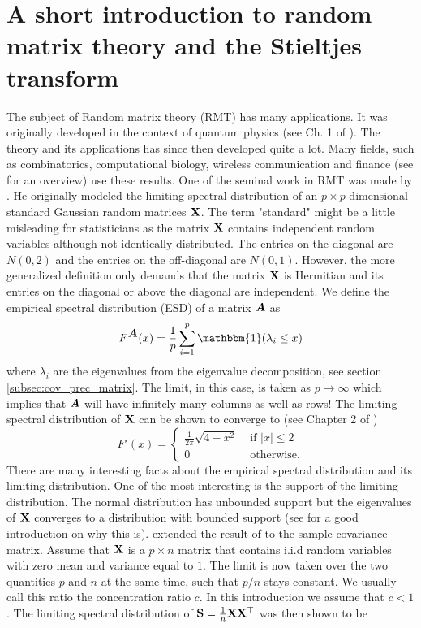\documentclass[oneside]{book}\usepackage{knitr}
\begin{document}
\section{A short introduction to random matrix theory and the Stieltjes transform}
The subject of Random matrix theory (RMT) has many applications. It was originally developed in the context of quantum physics (see Ch. 1 of \citet{mehta2004random}). The theory and its applications has since then developed quite a lot. Many fields, such as combinatorics, computational biology, wireless communication and finance (see \citet{REF} for an overview) use these results. One of the seminal work in RMT was made by \citet{wigner1993characteristic}. He originally modeled the limiting spectral distribution of an $p \times p$ dimensional standard Gaussian random matrices $\mathbf{X}$. The term "standard" might be a little misleading for statisticians as the matrix $\mathbf{X}$ contains independent random variables although not identically distributed. The entries on the diagonal are $N(0,2)$ and the entries on the off-diagonal are $N(0,1)$. However, the more generalized definition only demands that the matrix $\mathbf{X}$ is Hermitian and its entries on the diagonal or above the diagonal are independent. We define the empirical spectral distribution (ESD) of a matrix $\mbox{\boldmath$A$}$ as
$$
F^{\bA}(x)= \frac{1}{p} \sum_{i=1}^p \mathbbm{1}(\lambda_i \leq x)
$$ 
where $\lambda_i$ are the eigenvalues from the eigenvalue decomposition, see section \ref{subsec:cov_prec_matrix}. The limit, in this case, is taken as $p \rightarrow \infty$ which implies that $\mbox{\boldmath$A$}$ will have infinitely many columns as well as rows!
The limiting spectral distribution of $\mathbf{X}$ can be shown to converge to (see Chapter 2 of \citet{bai2010spectral})
$$
F'(x) = \begin{cases}
\frac{1}{2\pi} \sqrt{4-x^2} & \text{ if } |x|\leq 2 \\
0 & \text{ otherwise.}
\end{cases}
$$
There are many interesting facts about the empirical spectral distribution and its limiting distribution. One of the most interesting is the support of the limiting distribution. The normal distribution has unbounded support but the eigenvalues of $\mathbf{X}$ converges to a distribution with bounded support (see \citet{livan2018introduction} for a good introduction on why this is). \citet{zbMATH03244317} extended the result of \citet{wigner1993characteristic} to the sample covariance matrix. Assume that $\mathbf{X}$ is a $p \times n$ matrix that contains i.i.d random variables with zero mean and variance equal to $1$. The limit is now taken over the two quantities $p$ and $n$ at the same time, such that $p/n$ stays constant. We usually call this ratio the concentration ratio $c$. In this introduction we assume that $c<1$. The limiting spectral distribution of $\mathbf{S}=\frac{1}{n} \mathbf{X} \mathbf{X}^\top$ was then shown to be
\end{document}
